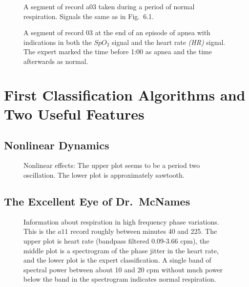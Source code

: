 \documentclass[prelim,showlabels]{book}
\begin{document}
\begin{figure}
  \caption[A segment of record a03]%
  {A segment of record a03 taken during a period of normal
    respiration.  Signals the same as in Fig.~6.1.}
  \label{fig:a03erN}
\end{figure}

\begin{figure}
  \caption[A segment of record 03 at the end of an episode of apnea]%
  {A segment of record 03 at the end of an episode of apnea with
    indications in both the $SpO_2$ signal and the heart rate
    \emph{(HR)} signal.  The expert marked the time before 1:00 as
    apnea and the time afterwards as normal.}
  \label{fig:a03erHR}
\end{figure}

\section{First Classification Algorithms and Two Useful Features}
\label{sec:NVG}

\addtocounter{subsection}{1}
\subsection{Nonlinear Dynamics}
\label{sec:NLD}

\begin{figure}
  \caption[Nonlinear effects]%
  {Nonlinear effects: The upper plot seems to be a period two
    oscillation.  The lower plot is approximately sawtooth.}
  \label{fig:ApneaNLD}
\end{figure}

\subsection{The Excellent Eye of Dr.\ McNames}
\label{sec:mcnames}

\begin{figure}
  \caption[Information about respiration in high
  frequency phase variations]%
  {Information about respiration in high frequency phase variations.
    This is the $a11$ record roughly between minutes 40 and 225.  The
    upper plot is heart rate (bandpass filtered 0.09-3.66 cpm), the
    middle plot is a spectrogram of the phase jitter in the heart
    rate, and the lower plot is the expert classification.  A single
    band of spectral power between about 10 and 20 cpm without much
    power below the band in the spectrogram indicates normal
    respiration.}
  \label{fig:sgram}
\end{figure}
\afterpage{\clearpage} %
\newpage
\end{document}
